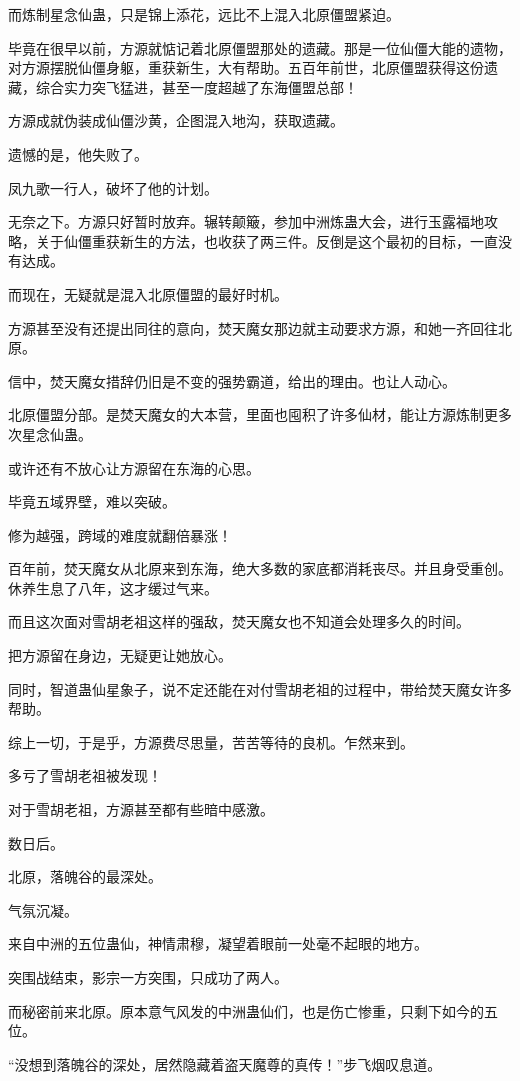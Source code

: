 \begin{this_body}
而炼制星念仙蛊，只是锦上添花，远比不上混入北原僵盟紧迫。

毕竟在很早以前，方源就惦记着北原僵盟那处的遗藏。那是一位仙僵大能的遗物，对方源摆脱仙僵身躯，重获新生，大有帮助。五百年前世，北原僵盟获得这份遗藏，综合实力突飞猛进，甚至一度超越了东海僵盟总部！

方源成就伪装成仙僵沙黄，企图混入地沟，获取遗藏。

遗憾的是，他失败了。

凤九歌一行人，破坏了他的计划。

无奈之下。方源只好暂时放弃。辗转颠簸，参加中洲炼蛊大会，进行玉露福地攻略，关于仙僵重获新生的方法，也收获了两三件。反倒是这个最初的目标，一直没有达成。

而现在，无疑就是混入北原僵盟的最好时机。

方源甚至没有还提出同往的意向，焚天魔女那边就主动要求方源，和她一齐回往北原。

信中，焚天魔女措辞仍旧是不变的强势霸道，给出的理由。也让人动心。

北原僵盟分部。是焚天魔女的大本营，里面也囤积了许多仙材，能让方源炼制更多次星念仙蛊。

或许还有不放心让方源留在东海的心思。

毕竟五域界壁，难以突破。

修为越强，跨域的难度就翻倍暴涨！

百年前，焚天魔女从北原来到东海，绝大多数的家底都消耗丧尽。并且身受重创。休养生息了八年，这才缓过气来。

而且这次面对雪胡老祖这样的强敌，焚天魔女也不知道会处理多久的时间。

把方源留在身边，无疑更让她放心。

同时，智道蛊仙星象子，说不定还能在对付雪胡老祖的过程中，带给焚天魔女许多帮助。

综上一切，于是乎，方源费尽思量，苦苦等待的良机。乍然来到。

多亏了雪胡老祖被发现！

对于雪胡老祖，方源甚至都有些暗中感激。

数日后。

北原，落魄谷的最深处。

气氛沉凝。

来自中洲的五位蛊仙，神情肃穆，凝望着眼前一处毫不起眼的地方。

突围战结束，影宗一方突围，只成功了两人。

而秘密前来北原。原本意气风发的中洲蛊仙们，也是伤亡惨重，只剩下如今的五位。

“没想到落魄谷的深处，居然隐藏着盗天魔尊的真传！”步飞烟叹息道。


\end{this_body}
